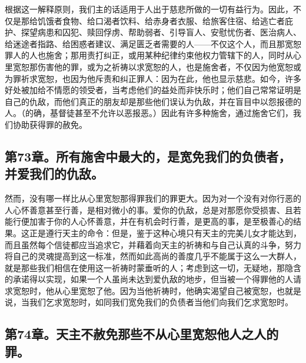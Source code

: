 根据这一解释原则，我们主的话适用于人出于慈悲所做的一切有益行为。因此，不仅是那给饥饿者食物、给口渴者饮料、给赤身者衣服、给旅客住宿、给逃亡者庇护、探望病患和囚犯、赎回俘虏、帮助弱者、引导盲人、安慰忧伤者、医治病人、给迷途者指路、给困惑者建议、满足匮乏者需要的人——不仅这个人，而且那宽恕罪人的人也施舍；那用责打纠正，或用某种纪律约束他权力管辖下的人，同时从心里宽恕那伤害他的罪，或为之祈祷以求宽恕的人，也是施舍者，不仅因为他宽恕或为罪祈求宽恕，也因为他斥责和纠正罪人：因为在此，他也显示慈悲。如今，许多好处被加给不情愿的领受者，当考虑他们的益处而非快乐时；他们自己常常证明是自己的仇敌，而他们真正的朋友却是那些他们误认为仇敌，并在盲目中以怨报德的人。（的确，基督徒甚至不允许以恶报恶。）因此有许多种施舍，通过施舍它们，我们协助获得罪的赦免。\par


\subsection{第73章。所有施舍中最大的，是宽免我们的负债者，并爱我们的仇敌。}

然而，没有哪一样比从心里宽恕那得罪我们的罪更大。因为对一个没有对你行恶的人心怀善意甚至行善，是相对微小的事。爱你的仇敌，总是对那愿你受损害、且若能行便加害于你的人心怀善意，并在有机会时行善，是更高的事，是至极善心的结果。这正是遵行天主的命令：但是，鉴于这种心境只有天主的完美儿女才能达到，而且虽然每个信徒都应当追求它，并藉着向天主的祈祷和与自己认真的斗争，努力将自己的灵魂提高到这一标准，然而如此高尚的善度几乎不能属于这么一大群人，就是那些我们相信在使用这一祈祷时蒙垂听的人；考虑到这一切，无疑地，那隐含的承诺得以实现，如果一个人虽尚未达到爱仇敌的地步，但当被一个得罪他的人请求宽恕时，他从心里宽恕了他。因为当他祈祷时，他确实渴望自己被宽恕，也就是说，当我们乞求宽恕时，如同我们宽免我们的负债者当他们向我们乞求宽恕时。\par


\subsection{第74章。天主不赦免那些不从心里宽恕他人之人的罪。}

